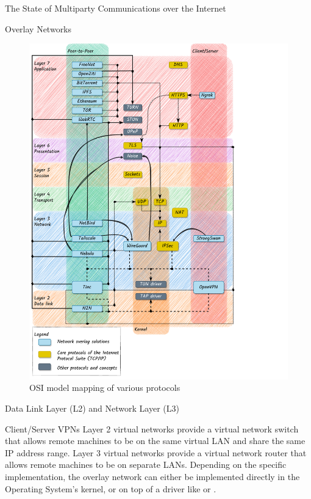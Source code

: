 \begin{frame}[fragile]{The State of Multiparty Communications over the
Internet}
\begin{block}{Overlay Networks}
\begin{figure}
\centering
\includegraphics[width=\textwidth,height=0.9\textheight]{thesis/../figures/osi-map-overlays.drawio.pdf}
\caption{OSI model mapping of various protocols
\label{osi-map-overlays}}
\end{figure}

\begin{block}{Data Link Layer (L2) and Network Layer (L3)}
\protect\hypertarget{data-link-layer-l2-and-network-layer-l3}{}
\begin{block}{Client/Server VPNs}
\protect\hypertarget{clientserver-vpns}{}
Layer 2 virtual networks provide a virtual network switch that allows
remote machines to be on the same virtual LAN and share the same IP
address range. Layer 3 virtual networks provide a virtual network router
that allows remote machines to be on separate LANs. Depending on the
specific implementation, the overlay network can either be implemented
directly in the Operating System's kernel, or on top of a driver like
 or .


\end{block}
\end{block}
\end{block}
\end{frame}
